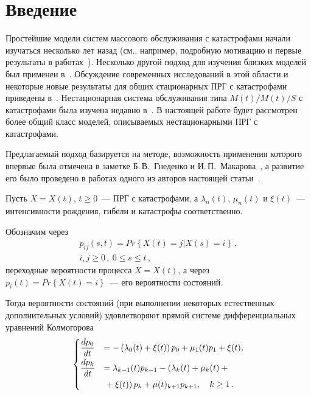       \begin{multicols}{2}

      \label{st\stat}

\section{Введение}

Простейшие модели систем массового обслуживания с катастрофами начали изучаться 
несколько лет назад (см., например, подробную мотивацию и первые результаты в 
работах~\cite{KK, Di}). Несколько другой подход для изучения близких моделей был 
применен в~\cite{DZ}. Обсуждение современных исследований в этой области и 
некоторые новые результаты для общих стационарных ПРГ с катастрофами приведены 
в~\cite{Di08}. Нестационарная система обслуживания типа  $M(t)/M(t)/S$ с 
катастрофами была изучена недавно в~\cite{z08}. В настоящей работе будет 
рассмотрен более общий класс моделей, опи\-сы\-ва\-емых нестационарными ПРГ с 
катастрофами.

Предлагаемый подход базируется на методе, возможность применения
которого впервые была отмечена в заметке Б.\,В.~Гнеденко и И.\,П.~Макарова~\cite{gm},  
а развитие его было проведено в работах одного из авторов настоящей 
 статьи~\cite{z85, z95b}.

Пусть $X=X(t)$, $t\geq 0$~--- ПРГ с катастрофами, а $\lambda_n(t)$,
$\mu_n(t)$ и $\xi (t)$~--- интенсивности рождения, гибели и
катастрофы  соответственно.

Обозначим через 
\begin{multline*}
p_{ij}(s,t)=Pr\left\{ X(t)=j\left| X(s)=i\right.
\right\}\,,\\
i,j \ge 0\,, \ 0\leq s\leq t\,,
\end{multline*} 
переходные вероятности
процесса $X=X(t)$, а через  $p_i(t)=Pr\left\{ X(t) =i \right\}$~---
его вероятности состояний.

Тогда вероятности состояний (при выполнении некоторых естественных
дополнительных условий) удовлетворяют прямой системе
дифференциальных уравнений Колмогорова
\begin{equation}
\begin{cases}
\displaystyle\frac{\displaystyle dp_0\mathstrut}{\displaystyle dt\mathstrut} &= -\left(\lambda_0 (t) + \xi(t)\right)p_0 +\mu_1(t)p_1 + \xi(t) ,  \\
\displaystyle\frac{\displaystyle dp_k\mathstrut}{\displaystyle dt\mathstrut} &= \lambda_{k-1} (t)p_{k-1} -\left(\lambda_{k} (t) +
\mu_{k}(t)+{}\right.\\
&\left.{}+
\xi(t)\right)p_k +\mu(t)_{k+1}p_{k+1}, \quad k \ge 1\,.
\end{cases}
\label{eq111}
\end{equation}


\end{multicols}
